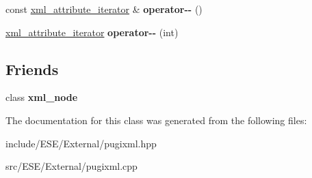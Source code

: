 \begin{DoxyCompactItemize}
\item 
\hypertarget{classpugi_1_1xml__attribute__iterator_a7ac06eb61d47a9e57bcd0fd2434c6243}{const \hyperlink{classpugi_1_1xml__attribute__iterator}{xml\-\_\-attribute\-\_\-iterator} \& {\bfseries operator-\/-\/} ()}\label{classpugi_1_1xml__attribute__iterator_a7ac06eb61d47a9e57bcd0fd2434c6243}

\item 
\hypertarget{classpugi_1_1xml__attribute__iterator_a48737f6e77abe7fa3e80841597dc93e1}{\hyperlink{classpugi_1_1xml__attribute__iterator}{xml\-\_\-attribute\-\_\-iterator} {\bfseries operator-\/-\/} (int)}\label{classpugi_1_1xml__attribute__iterator_a48737f6e77abe7fa3e80841597dc93e1}

\end{DoxyCompactItemize}
\subsection*{Friends}
\begin{DoxyCompactItemize}
\item 
\hypertarget{classpugi_1_1xml__attribute__iterator_a156d917a92815c7b593bd5ef19f6d5fb}{class {\bfseries xml\-\_\-node}}\label{classpugi_1_1xml__attribute__iterator_a156d917a92815c7b593bd5ef19f6d5fb}

\end{DoxyCompactItemize}


The documentation for this class was generated from the following files\-:\begin{DoxyCompactItemize}
\item 
include/\-E\-S\-E/\-External/pugixml.\-hpp\item 
src/\-E\-S\-E/\-External/pugixml.\-cpp\end{DoxyCompactItemize}
